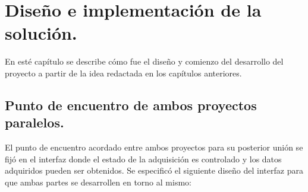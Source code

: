 \chapter{Diseño e implementación de la solución.}

En esté capítulo se describe cómo fue el diseño y comienzo del desarrollo del proyecto a partir de la idea redactada en los capítulos anteriores. 

\section{Punto de encuentro de ambos proyectos paralelos.}
	El punto de encuentro acordado entre ambos proyectos para su posterior unión se fijó en el interfaz donde el estado de la adquisición es controlado y los datos adquiridos pueden ser obtenidos. Se especificó el siguiente diseño del interfaz para que ambas partes se desarrollen en torno al mismo:

